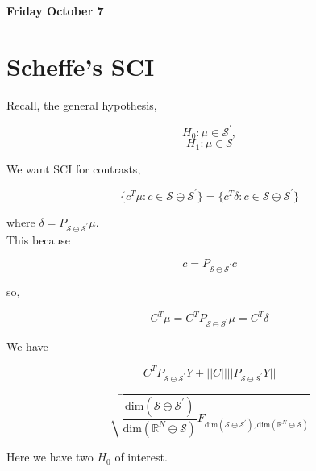 \documentclass[11pt,fleqn]{book} %
\begin{document}
\textbf{Friday October 7}\\

\section{Scheffe's SCI}

Recall, the general hypothesis,

		$$H_0: \mu \in \mathcal{S}^\prime, $$
		$$H_1: \mu \in \mathcal{S}$$

We want SCI for contrasts,

		$$\{c^T \mu: c \in \mathcal{S} \ominus \mathcal{S}^\prime \} = \{c^T \delta: c \in \mathcal{S} \ominus \mathcal{S}^\prime \} $$


where $\delta = P_{\mathcal{S} \ominus \mathcal{S}^\prime} \mu$. \\

This because
		
		$$c = P_{\mathcal{S} \ominus \mathcal{S}^\prime} c $$

so, 

		$$C^T \mu = C^T  P_{\mathcal{S} \ominus \mathcal{S}^\prime} \mu = C^T \delta$$


We have

		$$C^T P_{\mathcal{S} \ominus \mathcal{S}^\prime} Y \pm ||C|| ||P_{\mathcal{S} \ominus \mathcal{S}^\prime}Y|| $$

		$$\sqrt{ \frac{\text{dim}(\mathcal{S} \ominus \mathcal{S}^\prime)}{\text{dim}(\mathbb{R}^N \ominus \mathcal{S})} F_{\text{dim}(\mathcal{S} \ominus \mathcal{S}^\prime), \text{dim}(\mathbb{R}^N \ominus \mathcal{S})} } $$


Here we have two $H_0 $ of interest. 
\end{document}
